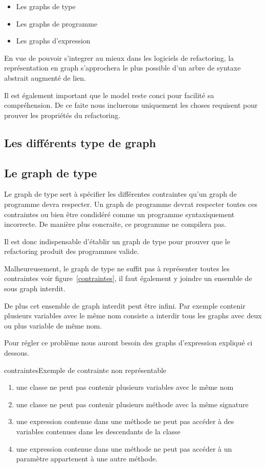 \documentclass[a4paper, 12pt]{article}
\begin{document}
\begin{itemize}[label=\textbullet]
\item Les graphs de type
\item Les graphs de programme
\item Les graphs d'expression
\end{itemize}

En vue de pouvoir s'integrer au mieux dans les logiciels de refactoring, la représentation en graph s'approchera le plus possible d'un arbre de syntaxe abstrait augmenté de lien.

Il est également important que le model reste conci pour facilité sa compréhension. De ce faite nous incluerons uniquement les choses requisent pour prouver les propriétés du refactoring.

\subsection{Les différents type de graph}

\subsection{Le graph de type}

Le graph de type sert à spécifier les différentes contraintes qu'un graph de programme devra respecter. Un graph de programme devrat respecter toutes ces contraintes ou bien être condidéré comme un programme syntaxiquement incorrecte. De manière plus concraite, ce programme ne compilera pas.

Il est donc indispensable d'établir un graph de type pour prouver que le refactoring produit des programmes valide.

Malheureusement, le graph de type ne suffit pas à représenter toutes les contraintes voir figure~\ref{contraintes}, il faut également y joindre un ensemble de sous graph interdit.

De plus cet ensemble de graph interdit peut être infini. Par exemple contenir plusieurs variables avec le même nom consiste a interdir tous les graphs avec deux ou plus variable de même nom.

Pour régler ce problème nous auront besoin des graphs d'expression expliqué ci dessous.\label{subsec:graphExpression}


\begin{myfig}{contraintes}{Exemple de contrainte non représentable}
\begin{enumerate}
 \scriptsize \item une classe ne peut pas contenir plusieurs variables avec le même nom
 \scriptsize \item une classe ne peut pas contenir plusieurs méthode avec la même signature
 \scriptsize \item une expression contenue dans une méthode ne peut pas accéder à des variables contenues dans les descendants de la classe
 \scriptsize \item une expression contenue dans une méthode ne peut pas accéder à un paramètre appartenent à une autre méthode.
\end{enumerate}
\end{myfig}
\end{document}
